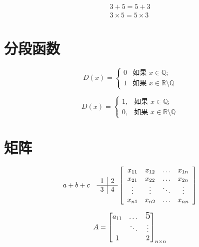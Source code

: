 \documentclass{article}
\begin{document}
    \begin{gather*}
    3+5=5+3 \\
    3 \times 5 = 5 \times 3
    \end{gather*}


\section{分段函数}
    
    $$
    D(x) = \left\{
    \begin{array}{ll}
    {0} & \text{如果 } x \in \mathbb{Q}; \\ 
    {1} & \text{如果 } x \in \mathbb{R} \setminus \mathbb{Q}
    \end{array}\right.
    $$

    \begin{equation}
    D(x) = \begin{cases}
    1, & \text{如果 } x \in \mathbb{Q}; \\
    0, & \text{如果 } x \in \mathbb{R} \setminus \mathbb{Q}
    \end{cases}
    \end{equation}


\section{矩阵}
    \[
    a + b \\ + c\quad %
    \begin{array}{l | l}
    {1} & {2} \\ 
    \hline
    {3} & {4}
    \end{array} 
    \left[\begin{array}{cccc}
    {x_{11}} & {x_{12}} & {\dots} & {x_{1 n}} \\ 
    {x_{21}} & {x_{22}} & {\dots} & {x_{2 n}} \\ 
    {\vdots} & {\vdots} & {\ddots} & {\vdots} \\ 
    {x_{n 1}} & {x_{n 2}} & {\dots} & {x_{n n}}
    \end{array}\right]
    \]

    \[
    A = \begin{bmatrix}
        a_{11} & \dots & \text{\Large5}\\ %
        & \ddots  & \vdots \\ %
        1 &  & 2    
    \end{bmatrix}_{n \times n} %
    \]
\end{document}
